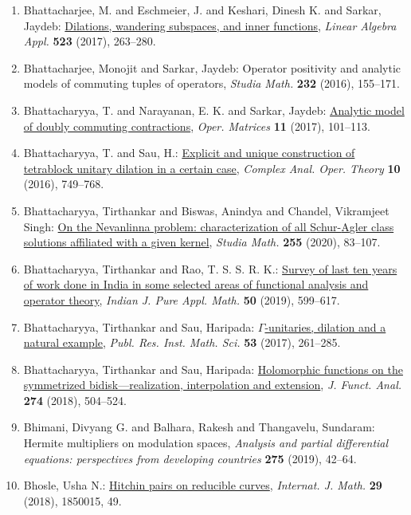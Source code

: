 \begin{enumerate}
{passage percolation}, \emph{J. Stat. Phys.} {\bf 181} (2020), 1410--1432.
\item Bhattacharjee, M. and Eschmeier, J. and Keshari, Dinesh K. and
Sarkar, Jaydeb: \href{https://doi.org/10.1016/j.laa.2017.02.032}{Dilations, wandering subspaces, and inner functions}, \emph{Linear Algebra Appl.} {\bf 523} (2017), 263--280.
\item Bhattacharjee, Monojit and Sarkar, Jaydeb: Operator positivity and analytic models of commuting tuples of
operators, \emph{Studia Math.} {\bf 232} (2016), 155--171.
\item Bhattacharyya, T. and Narayanan, E. K. and Sarkar, Jaydeb: \href{https://doi.org/10.7153/oam-11-07}{Analytic model of doubly commuting contractions}, \emph{Oper. Matrices} {\bf 11} (2017), 101--113.
\item Bhattacharyya, T. and Sau, H.: \href{https://doi.org/10.1007/s11785-015-0472-9}{Explicit and unique construction of tetrablock unitary
dilation in a certain case}, \emph{Complex Anal. Oper. Theory} {\bf 10} (2016), 749--768.
\item Bhattacharyya, Tirthankar and Biswas, Anindya and Chandel,
Vikramjeet Singh: \href{https://doi.org/10.4064/sm190505-8-10}{On the {N}evanlinna problem: characterization of all
{S}chur-{A}gler class solutions affiliated with a given
kernel}, \emph{Studia Math.} {\bf 255} (2020), 83--107.
\item Bhattacharyya, Tirthankar and Rao, T. S. S. R. K.: \href{https://doi.org/10.1007/s13226-019-0345-4}{Survey of last ten years of work done in {I}ndia in some
selected areas of functional analysis and operator theory}, \emph{Indian J. Pure Appl. Math.} {\bf 50} (2019), 599--617.
\item Bhattacharyya, Tirthankar and Sau, Haripada: \href{https://doi.org/10.4171/PRIMS/53-2-2}{{$\Gamma$}-unitaries, dilation and a natural example}, \emph{Publ. Res. Inst. Math. Sci.} {\bf 53} (2017), 261--285.
\item Bhattacharyya, Tirthankar and Sau, Haripada: \href{https://doi.org/10.1016/j.jfa.2017.09.013}{Holomorphic functions on the symmetrized bidisk---realization,
interpolation and extension}, \emph{J. Funct. Anal.} {\bf 274} (2018), 504--524.
\item Bhimani, Divyang G. and Balhara, Rakesh and Thangavelu,
Sundaram: Hermite multipliers on modulation spaces, \emph{Analysis and partial differential equations: perspectives from
developing countries} {\bf 275} (2019), 42--64.
\item Bhosle, Usha N.: \href{https://doi.org/10.1142/S0129167X18500155}{Hitchin pairs on reducible curves}, \emph{Internat. J. Math.} {\bf 29} (2018), 1850015, 49.

\end{enumerate}
